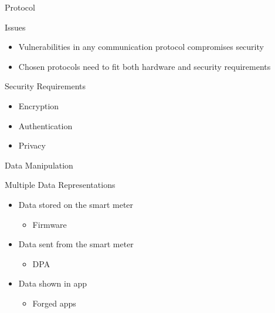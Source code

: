 \begin{frame}{Protocol}
\begin{block}{Issues}
  \begin{itemize}
    \item Vulnerabilities in any communication protocol compromises security
    \item Chosen protocols need to fit both hardware and security requirements
  \end{itemize}
\end{block}

\begin{block}{Security Requirements}
  \begin{itemize}
    \item Encryption
    \item Authentication
    \item Privacy
  \end{itemize}
\end{block}

\end{frame}


\begin{frame}{Data Manipulation}
  \begin{block}{Multiple Data Representations}
  \begin{itemize}
    \item Data stored on the smart meter
    \begin{itemize}
      \item Firmware
    \end{itemize}
    \item Data sent from the smart meter
    \begin{itemize}
      \item DPA
    \end{itemize}
    \item Data shown in app
    \begin{itemize}
      \item Forged apps
    \end{itemize}
  \end{itemize}
\end{block}
\end{frame}
